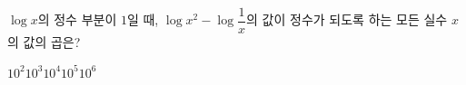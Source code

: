 $\log x$의 정수 부분이 $1$일 때, $\log x^2-\log\dfrac{1}{x}$의 값이 정수가 되도록 하는 모든 실수 $x$의 값의 곱은?
\begin{choices32}{$10^2$}{$10^3$}{$10^4$}{$10^5$}{$10^6$}\end{choices32}

